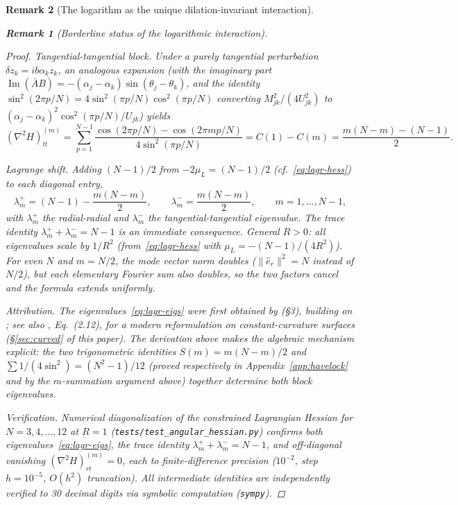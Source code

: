 \documentclass[12pt, a4paper]{article}
\newtheorem{remark}{Remark}[section]
\numberwithin{equation}{section}
\begin{document}
\begin{remark}[The logarithm as the unique dilation-invariant interaction]
\begin{remark}[Borderline status of the logarithmic interaction]
\begin{proof}
\emph{Tangential-tangential block.}
Under a purely tangential perturbation $\delta z_k = ib\alpha_k z_k$,
an analogous expansion (with the imaginary part $\operatorname{Im}(\bar A B)
= -(\alpha_j - \alpha_k)\sin(\theta_j - \theta_k)$, and the
identity $\sin^2(2\pi p/N) = 4\sin^2(\pi p/N)\cos^2(\pi p/N)$
converting $M_{jk}^2/(4U_{jk}^2)$ to
$(\alpha_j - \alpha_k)^2\cos^2(\pi p/N)/U_{jk}$) yields
\[
  (\nabla^2 H)_{tt}^{(m)}
   = \sum_{p=1}^{N-1}\frac{\cos(2\pi p/N) - \cos(2\pi mp/N)}{4\sin^2(\pi p/N)}
   = C(1) - C(m)
   = \frac{m(N{-}m) - (N{-}1)}{2}.
\]

\emph{Lagrange shift.}
Adding $(N{-}1)/2$ from $-2\mu_L = (N{-}1)/2$
(cf.~\eqref{eq:lagr-hess}) to each diagonal entry,
\begin{equation}\label{eq:lagr-eigs}
  \lambda_m^+ = (N-1) - \frac{m(N-m)}{2},
  \qquad
  \lambda_m^- = \frac{m(N-m)}{2},
  \qquad m = 1, \ldots, N-1,
\end{equation}
with $\lambda_m^+$ the radial-radial and $\lambda_m^-$ the
tangential-tangential eigenvalue. The trace identity
$\lambda_m^+ + \lambda_m^- = N - 1$ is an immediate consequence.
General $R > 0$: all eigenvalues scale by $1/R^2$
(from~\eqref{eq:lagr-hess} with $\mu_L = -(N{-}1)/(4R^2)$).
For even $N$ and $m = N/2$, the mode vector norm doubles
($\|\hat e_r\|^2 = N$ instead of $N/2$), but each elementary
Fourier sum also doubles, so the two factors cancel and the formula
extends uniformly.

\emph{Attribution.}
The eigenvalues~\eqref{eq:lagr-eigs} were first obtained by
\citet{Havelock1931} (\S3), building on \citet{Thomson1883};
see also \citet{BoattoCabral2003}, Eq.~(2.12), for a modern
reformulation on constant-curvature surfaces
(\S\ref{sec:curved} of this paper).
The derivation above makes the algebraic mechanism explicit: the
two trigonometric identities $S(m) = m(N{-}m)/2$ and
$\sum 1/(4\sin^2) = (N^2{-}1)/12$ (proved respectively in
Appendix~\ref{app:havelock} and by the $m$-summation argument above)
together determine both block eigenvalues.

\emph{Verification.}
Numerical diagonalization of the constrained Lagrangian
Hessian for $N = 3, 4, \ldots, 12$ at $R = 1$
(\texttt{tests/test\_angular\_hessian.py}) confirms both
eigenvalues~\eqref{eq:lagr-eigs}, the trace identity
$\lambda_m^+ + \lambda_m^- = N{-}1$, and off-diagonal vanishing
$(\nabla^2 H)_{rt}^{(m)} = 0$, each to finite-difference
precision ($10^{-2}$, step $h = 10^{-5}$, $O(h^2)$ truncation).
All intermediate identities are independently verified to 30
decimal digits via symbolic computation (\texttt{sympy}).


\end{proof}
\end{remark}
\end{remark}
\end{document}
